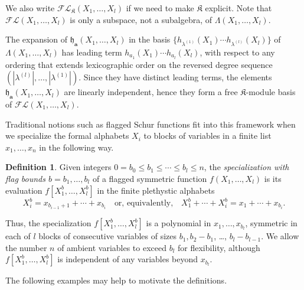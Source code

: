 \documentclass[12pt]{amsart}
\theoremstyle{definition}
\newtheorem{defn}[thm]{Definition}
\theoremstyle{remark}
\newcommand{\aA}{{\mathbf a}}
\newcommand{\fh}{{\mathfrak h}}
\newcommand{\Kfrak}{{\mathfrak K}}
\newcommand{\FLambda}{\mathcal{F\!L}}
\begin{document}
We also write $\FLambda _{\Kfrak }(X_{1},\ldots,X_{l})$ if we need to
make $\Kfrak $ explicit.  Note that $\FLambda(X_{1},\ldots,X_{l})$ is
only a subspace, not a subalgebra, of $\Lambda (X_{1},\ldots,X_{l})$.

The expansion of ${\fh}_{\aA }(X_{1},\ldots,X_{l})$ in the basis
$\{h_{\lambda ^{(1)}}(X_{1})\cdots h_{\lambda ^{(l)}}(X_{l})\}$ of
$\Lambda (X_{1},\ldots, X_{l})$ has leading term
$h_{a_{1}}(X_{1})\cdots h_{a_{l}}(X_{l})$, with respect to any
ordering that extends lexicographic order on the reversed degree
sequence $(|\lambda ^{(l)}|,\ldots,|\lambda ^{(1)}|)$.  Since they
have distinct leading terms, the elements $\fh _{\aA
}(X_{1},\ldots,X_{l})$ are linearly independent, hence they form a
free $\Kfrak $-module basis of $\FLambda(X_{1},\ldots,X_{l})$.

Traditional notions such as flagged Schur functions fit into this
framework when we specialize the formal alphabets $X_{i}$ to blocks of
variables in a finite list $x_{1},\ldots,x_{n}$ in the following way.

\begin{defn}\label{def:flag-bounds}
Given integers $0 = b_{0}\leq b_{1}\leq \cdots \leq b_{l} \leq n$, the
{\em specialization with flag bounds $b= b_{1},\ldots,b_{l}$} of a
flagged symmetric function $ f(X_{1},\ldots,X_{l})$ is its evaluation
$f[X^b_{1},\ldots,X^b_{l}]$ in the finite plethystic alphabets
\begin{equation}\label{e:X-for-flag-bounds}
X_{i}^b = x_{b_{i-1}+1} +\cdots +x_{b_{i}} \quad \text{or,
equivalently,}\quad X_{1}^b+\cdots +X_{i}^b = x_{1} +\cdots +x_{b_{i}}.
\end{equation}
\end{defn}

Thus, the specialization $f[X_{1}^b,\ldots,X_{l}^b]$ is a polynomial
in $x_{1},\ldots,x_{b_{l}}$, symmetric in each of $l$ blocks of
consecutive variables of sizes $b_{1}, b_{2}-b_{1}$, \ldots,
$b_{l}-b_{l-1}$.  We allow the number $n$ of ambient variables to
exceed $b_{l}$ for flexibility, although $f[X_{1}^b,\ldots,X_{l}^b]$
is independent of any variables beyond $x_{b_{l}}$.

The following examples may help to motivate the definitions.
\end{document}
